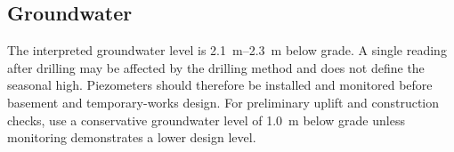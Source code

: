 \subsection{Groundwater}
The interpreted groundwater level is \SIrange{2.1}{2.3}{\metre} below grade. A single reading
after drilling may be affected by the drilling method and does not define the seasonal high.
Piezometers should therefore be installed and monitored before basement and temporary-works
design. For preliminary uplift and construction checks, use a conservative groundwater level of
\SI{1.0}{\metre} below grade unless monitoring demonstrates a lower design level.

